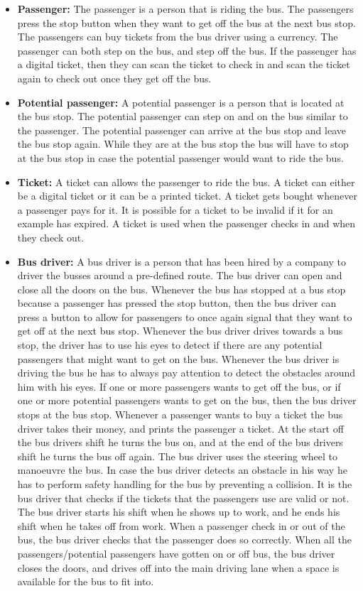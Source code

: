 \begin{itemize}
\item \textbf{Passenger:}
The passenger is a person that is riding the bus. The passengers press the stop button when they want to get off the bus at the next bus stop. The passengers can buy tickets from the bus driver using a currency. The passenger can both step on the bus, and step off the bus. If the passenger has a digital ticket, then they can scan the ticket to check in and scan the ticket again to check out once they get off the bus.
\item \textbf{Potential passenger:}
A potential passenger is a person that is located at the bus stop. The potential passenger can step on and on the bus similar to the passenger. The potential passenger can arrive at the bus stop and leave the bus stop again. While they are at the bus stop the bus will have to stop at the bus stop in case the potential passenger would want to ride the bus.
\item \textbf{Ticket:}
A ticket can allows the passenger to ride the bus. A ticket can either be a digital ticket or it can be a printed ticket. A ticket gets bought whenever a passenger pays for it. It is possible for a ticket to be invalid if it for an example has expired. A ticket is used when the passenger checks in and when they check out.
\item \textbf{Bus driver:}
A bus driver is a person that has been hired by a company to driver the busses around a pre-defined route. The bus driver can open and close all the doors on the bus. Whenever the bus has stopped at a bus stop because a passenger has pressed the stop button, then the bus driver can press a button to allow for passengers to once again signal that they want to get off at the next bus stop. Whenever the bus driver drives towards a bus stop, the driver has to use his eyes to detect if there are any potential passengers that might want to get on the bus. Whenever the bus driver is driving the bus he has to always pay attention to detect the obstacles around him with his eyes. If one or more passengers wants to get off the bus, or if one or more potential passengers wants to get on the bus, then the bus driver stops at the bus stop. Whenever a passenger wants to buy a ticket the bus driver takes their money, and prints the passenger a ticket. At the start off the bus drivers shift he turns the bus on, and at the end of the bus drivers shift he turns the bus off again. The bus driver uses the steering wheel to manoeuvre the bus. In case the bus driver detects an obstacle in his way he has to perform safety handling for the bus by preventing a collision. It is the bus driver that checks if the tickets that the passengers use are valid or not. The bus driver starts his shift when he shows up to work, and he ends his shift when he takes off from work. When a passenger check in or out of the bus, the bus driver checks that the passenger does so correctly. When all the passengers/potential passengers have gotten on or off bus, the bus driver closes the doors, and drives off into the main driving lane when a space is available for the bus to fit into.

\end{itemize}

